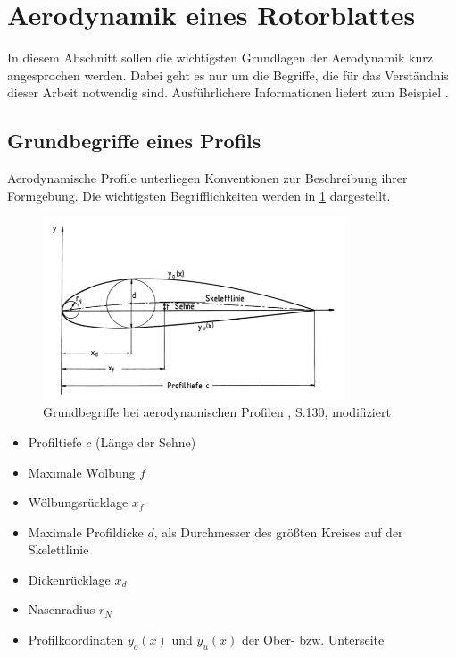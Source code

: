\section{Aerodynamik eines Rotorblattes}
In diesem Abschnitt sollen die wichtigsten Grundlagen der Aerodynamik kurz angesprochen werden. Dabei geht es nur um die Begriffe, die für das Verständnis dieser Arbeit notwendig sind. Ausführlichere Informationen liefert zum Beispiel \textcite{anderson_fundamentals_2017}. 
\subsection{Grundbegriffe eines Profils}
Aerodynamische Profile unterliegen Konventionen zur Beschreibung ihrer Formgebung. Die wichtigsten Begrifflichkeiten werden in \cref{fig:profil_begriffe} dargestellt.

\begin{figure}[htbp] %
    \centering %
    \includegraphics[width=0.8\textwidth]{figures/profil_begriffe.png} %
    \caption{Grundbegriffe bei aerodynamischen Profilen \cite{hau_physikalische_2016}, S.130, modifiziert} %
    \label{fig:profil_begriffe} %
\end{figure}

\begin{itemize}
    \item Profiltiefe \( c \) (Länge der Sehne)
    \item Maximale Wölbung \( f \)
    \item Wölbungsrücklage \( x_f \)
    \item Maximale Profildicke \( d \), als Durchmesser des größten Kreises auf der Skelettlinie
    \item Dickenrücklage \( x_d \)
    \item Nasenradius \( r_N \)
    \item Profilkoordinaten \( y_o(x) \) und \( y_u(x) \) der Ober- bzw. Unterseite
\end{itemize}

